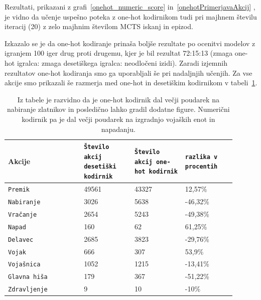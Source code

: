 \documentclass[a4paper, 12pt]{book}
\begin{document}
Rezultati, prikazani z grafi~\ref{onehot_numeric_score} in~\ref{onehotPrimerjavaAkcij} , je vidno da učenje uspešno poteka z one-hot kodirnikom tudi pri majhnem številu iteracij (20) z zelo majhnim številom MCTS iskanj in epizod.

Izkazalo se je da one-hot kodiranje prinaša boljše rezultate po ocenitvi modelov z igranjem 100 iger drug proti drugemu, kjer je bil rezultat 72:15:13 (zmaga one-hot igralca: zmaga desetiškega igralca: neodločeni izidi).
Zaradi izjemnih rezultatov one-hot kodiranja smo ga uporabljali še pri nadaljnjih učenjih.
Za vse akcije smo prikazali še razmerja med one-hot in desetiškim kodirnikom v tabeli~\ref{tableencoders}.

\begin{table}
	
	\begin{center}
		
		\begin{tabular}{p{0.3\linewidth}|p{0.2\linewidth}|p{0.2\linewidth}|p{0.2\linewidth}}
			Akcije             & {\tt Število akcij desetiški kodirnik} & {\tt Število akcij one-hot kodirnik} & {\tt razlika v procentih}\\ \hline
			{\tt Premik}       & 49561                   & 43327                      & 12,57\%                                           \\
			{\tt Nabiranje}    & 3026                    & 5638                       & -46,32\%                                          \\
			{\tt Vračanje}     & 2654                    & 5243                        & -49,38\%                                         \\
			{\tt Napad}        & 160                     & 62                       & 61,25\%                                             \\
			{\tt Delavec}      & 2685                    & 3823                       & -29,76\%                                          \\
			{\tt Vojak}        & 666                     & 307                        &53,9\%                                             \\
			{\tt Vojašnica}    & 1052                    & 1215                      & -13,41\%                                           \\
			{\tt Glavna hiša}  & 179                     & 367                       & -51,22\%                                           \\
			{\tt Zdravljenje}  & 9                       & 10                        & -10\%                                              \\
		\end{tabular}
	\end{center}
	\caption{Iz tabele je razvidno da je one-hot kodirnik dal večji poudarek na nabiranje zlatnikov in posledično lahko gradil dodatne figure.
	Numerični kodirnik pa je dal večji poudarek na izgradnjo vojaških enot in napadanju.}
	\label{tableencoders}
\end{table}
\end{document}
